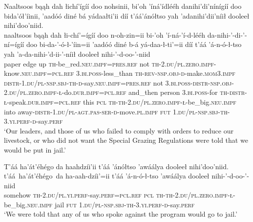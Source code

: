 \ea\label{ex:text7-2-7}
Naaltsoos bąąh dah łichí’ígíí doo nohsinii, bi’oh ’íná’ídlééh danihi’di’nínígíí doo bida’ół’íinii, ’aadóó diné bá yádaałti’ii díí t’áá’ánółtso yah ’adanihi’dii’níił dooleeł nihi’doo’niid.\\
\gll naaltsoos	bąąh	dah	łi-chí’=ígíí	doo	n-oh-zin=ii	bi-’oh	’í-ná-’í-d-lééh	da-nihi-’-di-’-ní=ígíí	doo	bi-da-’-ó-ł-’íin=ii	’aadóó	diné	b-á	yá-daa-ł-ti’=ii	díí	t’áá ’á-n-ó-ł-tso	yah	’a-da-nihi-’d-ii-’-níił	dooleeł	nihi-’-d-oo-’-niid\\
     paper	edge	up	\textsc{th}-be\_red.\textsc{neu}.\textsc{impf}=\textsc{pres}.\textsc{ref}	not	\textsc{th}-2.\textsc{du}/\textsc{pl}.\textsc{zero}.\textsc{impf}-know.\textsc{neu}.\textsc{impf}=\textsc{pcl}.\textsc{ref}	3.\textsc{bi}.\textsc{poss}-less\_than	\textsc{th}-\textsc{rev}-\textsc{nsp}.\textsc{obj}-\textsc{d}-make.\textsc{mom}3.\textsc{impf}	\textsc{distr}-1.\textsc{du}/\textsc{pl}-\textsc{nsp}.\textsc{sbj}-\textsc{th}-\textsc{d}-say.\textsc{neu}.\textsc{impf}=\textsc{pres}.\textsc{ref}	not	3.\textsc{bi}.\textsc{poss}-\textsc{distr}-\textsc{nsp}.\textsc{obj}-2.\textsc{du}/\textsc{pl}.\textsc{zero}.\textsc{impf}-\textsc{ł}-do.\textsc{dur}.\textsc{impf}=\textsc{pcl}.\textsc{ref}	and\_then	person	3.\textsc{bi}.\textsc{poss}-for	\textsc{th}-\textsc{distr}-\textsc{ł}-speak.\textsc{dur}.\textsc{impf}=\textsc{pcl}.\textsc{ref}	this	\textsc{pcl} \textsc{th}-\textsc{th}-2.\textsc{du}/\textsc{pl}.\textsc{zero}.\textsc{impf}-\textsc{ł}-be\_big.\textsc{neu}.\textsc{impf}	into	away-\textsc{distr}-1.\textsc{du}/\textsc{pl}-\textsc{agt}.\textsc{pas}-\textsc{ser}-\textsc{d}-move.\textsc{pl}.\textsc{impf}	\textsc{fut}	1.\textsc{du}/\textsc{pl}-\textsc{nsp}.\textsc{sbj}-\textsc{th}-3.\textsc{yi}.\textsc{perf}-\textsc{d}-say.\textsc{perf}\\
\glt `Our leaders, and those of us who failed to comply with orders to reduce our livestock, or who did not want the Special Grazing Regulations were told that we would be put in jail.'
\z

\ea\label{ex:text7-2-8}
T’áá ha’át’éhégo da haahdzíi’ii t’áá ’ánółtso ’awáálya dooleeł nihi’doo’niid.\\
\gll t’áá~ha’át’éhégo~{da}	ha-aah-dzíi’=ii	t’áá ’á-n-ó-ł-tso	’awáálya	dooleeł	nihi-’-d-oo-’-niid\\
     somehow	\textsc{th}-2.\textsc{du}/\textsc{pl}.\textsc{yi}.\textsc{perf}-say.\textsc{perf}=\textsc{pcl}.\textsc{ref}	\textsc{pcl} \textsc{th}-\textsc{th}-2.\textsc{du}/\textsc{pl}.\textsc{zero}.\textsc{impf}-\textsc{ł}-be\_big.\textsc{neu}.\textsc{impf}	jail	\textsc{fut}	1.\textsc{du}/\textsc{pl}-\textsc{nsp}.\textsc{sbj}-\textsc{th}-3.\textsc{yi}.\textsc{perf}-\textsc{d}-say.\textsc{perf}\\
\glt `We were told that any of us who spoke against the program would go to jail.'
\z

